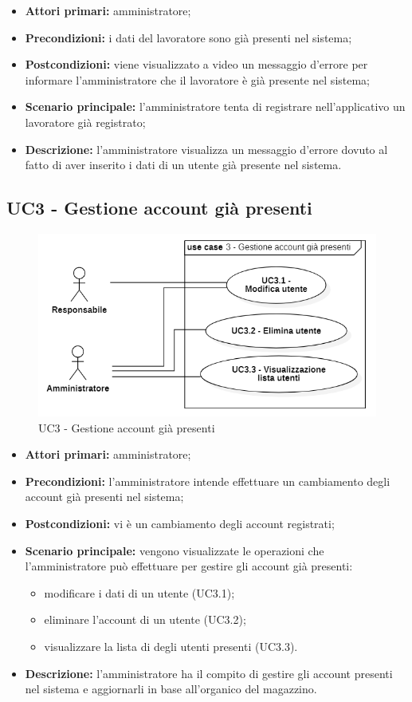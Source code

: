 \begin{itemize}
	\item 	\textbf{Attori primari:} amministratore;
	\item 	\textbf{Precondizioni:} i dati del lavoratore sono già presenti nel sistema;
	\item 	\textbf{Postcondizioni:} viene visualizzato a video un messaggio d'errore per informare l'amministratore che il lavoratore è già presente nel sistema;
	\item 	\textbf{Scenario principale:} l'amministratore tenta di registrare nell'applicativo un lavoratore già registrato;
	\item 	\textbf{Descrizione:} l'amministratore visualizza un messaggio d'errore dovuto al fatto di aver inserito i dati di un utente già presente nel sistema.
\end{itemize}

\subsection{UC3 - Gestione account già presenti}
\begin{figure}[H]
	\centering
	\includegraphics[scale=0.52]{res/images/uc3.png}
	\caption{UC3 - Gestione account già presenti}
\end{figure}

\begin{itemize}
	\item 	\textbf{Attori primari:} amministratore;
	\item 	\textbf{Precondizioni:} l'amministratore intende effettuare un cambiamento degli account già presenti nel sistema;
	\item 	\textbf{Postcondizioni:} vi è un cambiamento degli account registrati;
	\item 	\textbf{Scenario principale:} vengono visualizzate le operazioni che l'amministratore può effettuare per gestire gli account già presenti:
	\begin{itemize}
		\item modificare i dati di un utente (UC3.1);
		\item eliminare l'account di un utente (UC3.2);
		\item visualizzare la lista di degli utenti presenti (UC3.3).
	\end{itemize}
	\item 	\textbf{Descrizione:} l'amministratore ha il compito di gestire gli account presenti nel sistema e aggiornarli in base all'organico del magazzino.
\end{itemize}

